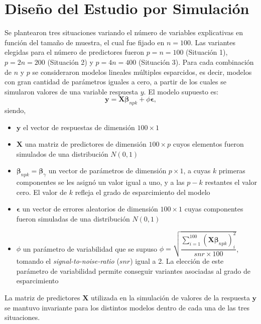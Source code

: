 \documentclass[a4paper,12pt]{report}
\begin{document}
\section{Diseño del Estudio por Simulación}
Se plantearon tres situaciones variando el número de variables explicativas en función del tamaño de muestra, el cual fue fijado en $n = 100$. Las variantes elegidas para el número de predictores fueron $p = n = 100$ (Situación 1), $p = 2n = 200$ (Situación 2) y $p = 4n = 400$ (Situación 3). Para cada combinación de $n$ y $p$ se consideraron modelos lineales múltiples esparcidos, es decir, modelos con gran cantidad de parámetros iguales a cero, a partir de los cuales se simularon valores de una variable respuesta $y$. El modelo supuesto es:
\begin{equation}
\boldsymbol{y} = \boldsymbol{X}\boldsymbol{\beta}_{npk} + \phi \boldsymbol{\epsilon},
\end{equation} 
siendo,

\begin{itemize}
\item $\boldsymbol{y}$ el vector de respuestas de dimensión $100 \times 1$

\item $\boldsymbol{X}$ una matriz de predictores de dimensión $100 \times p$ cuyos elementos fueron simulados de una distribución $N(0,1)$

\item $\boldsymbol{\beta}_{npk} = \boldsymbol{\beta}_\gamma$ un vector de parámetros de dimensión $p \times 1$, a cuyas $k$ primeras componentes se les asignó un valor igual a uno, y a las $p - k$ restantes el valor cero. El valor de $k$ refleja el grado de esparcimiento del modelo

\item $\boldsymbol{\epsilon}$ un vector de errores aleatorios de dimensión $100 \times 1$ cuyas componentes fueron simuladas de una distribución $N(0,1)$

\item $\phi$ un parámetro de variabilidad que se supuso $\phi = \sqrt{\dfrac{\sum_{i=1}^{100} \left(\boldsymbol{X}\boldsymbol{\beta}_{npk}\right)_i^2}{snr \times 100}}$, tomando el \textit{signal-to-noise-ratio} ($snr$) igual a 2. La elección de este parámetro de variabilidad permite conseguir variantes asociadas al grado de esparcimiento \citep{bien2016simulator}
\end{itemize}

La matriz de predictores $\boldsymbol{X}$ utilizada en la simulación de valores de la respuesta $\boldsymbol{y}$ se mantuvo invariante para los distintos modelos dentro de cada una de las tres situaciones.
\end{document}
